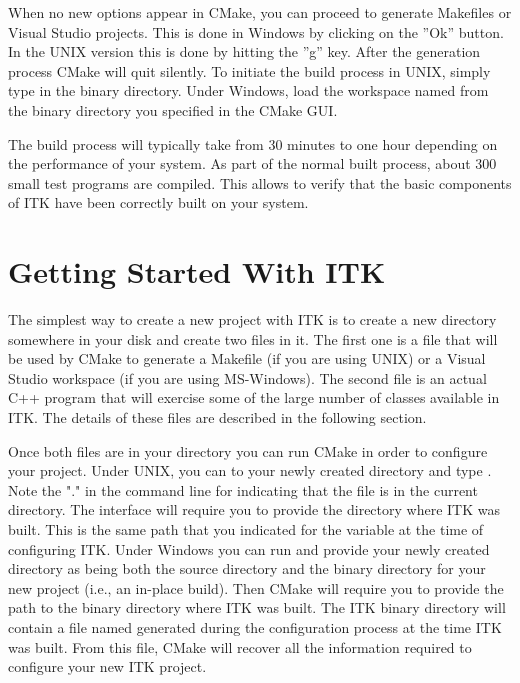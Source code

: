 When no new options appear in CMake, you can proceed to generate Makefiles or
Visual Studio projects. This is done in Windows by clicking on the ''Ok''
button.  In the UNIX version this is done by hitting the ''g'' key. After the
generation process CMake will quit silently. To initiate the build process
in UNIX, simply type  in the binary directory. Under Windows, load
the workspace named  from the binary directory you specified
in the CMake GUI.

The build process will typically take from 30 minutes to one hour depending
on the performance of your system. As part of the normal built process, about
300 small test programs are compiled. This allows to verify that the basic
components of ITK have been correctly built on your system.

\section{Getting Started With ITK }
\label{sec:GettingStartedWithITK}
 
The simplest way to create a new project with ITK is to create a new directory
somewhere in your disk and create two files in it. The first one is a
 file that will be used by CMake to generate a Makefile
(if you are using UNIX) or a Visual Studio workspace (if you are using
MS-Windows).  The second file is an actual C++ program that will exercise
some of the large number of classes available in ITK. The details of these files
are described in the following section.

Once both files are in your directory you can run CMake in order to configure
your project. Under UNIX, you can  to your newly created directory
and type . Note the "." in the command line for indicating
that the  file is in the current directory. The
 interface will require you to provide the directory where ITK
was built. This is the same path that you indicated for the
 variable at the time of configuring ITK. Under
Windows you can run  and provide your newly created
directory as being both the source directory and the binary directory for
your new project (i.e., an in-place build). Then CMake will require you to
provide the path to the binary directory where ITK was built. The ITK binary
directory will contain a file named  generated during the
configuration process at the time ITK was built.  From this file, CMake will
recover all the information required to configure your new ITK project.

